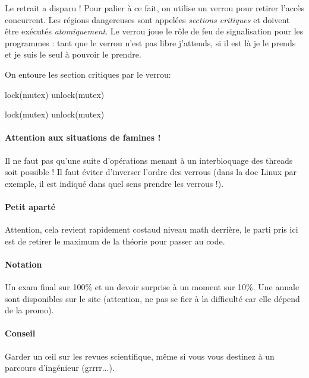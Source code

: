 \documentclass{article}
\begin{document}
Le retrait a disparu ! Pour palier à ce fait, on utilise un verrou pour retirer l'accès concurrent. Les régions dangereuses sont appelées \emph{sections critiques} et doivent être exécutés \emph{atomiquement}. Le verrou joue le rôle de feu de signalisation pour les programmes : tant que le verrou n'est pas libre j'attends, si il est là je le prends et je suis le seul à pouvoir le prendre.

On entoure les section critiques par le verrou:
\begin{algorithm}
lock(mutex) 
unlock(mutex)\;
\end{algorithm}

\begin{algorithm}
lock(mutex) 
unlock(mutex)\;
\end{algorithm}

\paragraph{Attention aux situations de famines !} Il ne faut pas qu'une suite d'opérations menant à un interbloquage des threads soit possible ! Il faut éviter d'inverser l'ordre des verrous (dans la doc Linux par exemple, il est indiqué dans quel sens prendre les verrous !).


\paragraph{Petit aparté} Attention, cela revient rapidement costaud niveau math derrière, le parti pris ici est de retirer le maximum de la théorie pour passer au code.

\paragraph{Notation} Un exam final sur 100\% et un devoir surprise à un moment sur 10\%. Une annale sont disponibles sur le site (attention, ne pas se fier à la difficulté car elle dépend de la promo).

\paragraph{Conseil} Garder un œil sur les revues scientifique, même si vous vous destinez à un parcours d'ingénieur (grrrr...).
\end{document}
